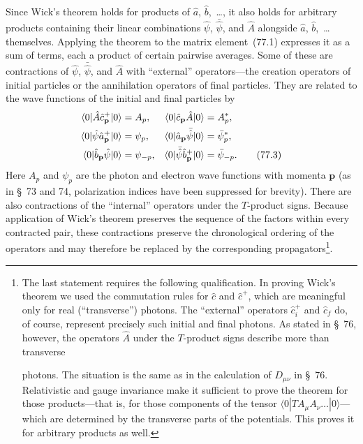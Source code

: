 Since Wick's theorem holds for products of $\hat a$, $\hat b$,~\ldots, it also holds for arbitrary products containing their linear combinations $\hat\psi$, $\bar{\hat\psi}$, and $\hat A$ alongside $\hat a$, $\hat b$,~\ldots themselves. Applying the theorem to the matrix element~(77.1) expresses it as a sum of terms, each a product of certain pairwise averages. Some of these are contractions of $\hat\psi$, $\bar{\hat\psi}$, and $\hat A$ with ``external'' operators---the creation operators of initial particles or the annihilation operators of final particles. They are related to the wave functions of the initial and final particles by
\begin{align}
\langle0|\hat A\hat c^+_{\mathbf p}|0\rangle&=A_p,
&\langle0|\hat c_{\mathbf p}\hat A|0\rangle&=A_p^*,\notag\\
\langle0|\hat\psi\hat a^+_{\mathbf p}|0\rangle&=\psi_p,
&\langle0|\hat a_{\mathbf p}\bar{\hat\psi}|0\rangle&=\bar\psi_p^*,\notag\\
\langle0|\hat b_{\mathbf p}\hat\psi|0\rangle&=\psi_{-p},
&\langle0|\bar{\hat\psi}\hat b^+_{\mathbf p}|0\rangle&=\bar\psi_{-p}.
\tag{77.3}
\end{align}
Here $A_p$ and $\psi_p$ are the photon and electron wave functions with momenta $\mathbf p$ (as in \S~73 and 74, polarization indices have been suppressed for brevity). There are also contractions of the ``internal'' operators under the $T$-product signs. Because application of Wick's theorem preserves the sequence of the factors within every contracted pair, these contractions preserve the chronological ordering of the operators and may therefore be replaced by the corresponding propagators\footnote{The last statement requires the following qualification. In proving Wick's theorem we used the commutation rules for $\hat c$ and $\hat c^+$, which are meaningful only for real (``transverse'') photons. The ``external'' operators $\hat c_i^+$ and $\hat c_f$ do, of course, represent precisely such initial and final photons. As stated in \S~76, however, the operators $\hat A$ under the $T$-product signs describe more than transverse

photons. The situation is the same as in the calculation of $D_{\mu\nu}$ in \S~76. Relativistic and gauge invariance make it sufficient to prove the theorem for those products---that is, for those components of the tensor $\langle0|TA_\mu A_\nu\ldots|0\rangle$---which are determined by the transverse parts of the potentials. This proves it for arbitrary products as well.}.

